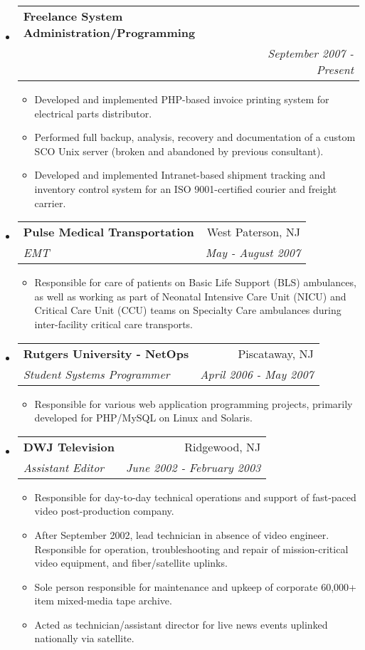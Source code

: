 \documentclass[letterpaper,11pt]{article}
\makeatletter
\newcommand{\resitem}[1]{\item #1 \vspace{-2pt}}
\newcommand{\ressubheading}[4]{
\begin{tabular*}{7.0in}{l@{\extracolsep{\fill}}r}
		\textbf{#1} & #2 \\
		\textit{#3} & \textit{#4} \\
\end{tabular*}\vspace{-6pt}}
\makeatother
\begin{document}
\begin{itemize}
\item
        \ressubheading{Freelance System Administration/Programming}{ }{ }{September 2007 - Present}
        \begin{itemize}
               \resitem{Developed and implemented PHP-based invoice printing
                 system for electrical parts distributor.}
               \resitem{Performed full backup, analysis, recovery and documentation of a
                 custom SCO Unix server (broken and abandoned by previous consultant).}
               \resitem{Developed and implemented Intranet-based shipment tracking and
                 inventory control system for an ISO 9001-certified courier
                 and freight carrier.}
        \end{itemize}
\item
        \ressubheading{Pulse Medical Transportation}{West Paterson, NJ}{EMT}{May - August 2007}
        \begin{itemize}
                \resitem{Responsible for care of patients on Basic Life
                  Support (BLS) ambulances, as well as working as part of 
                  Neonatal Intensive Care Unit (NICU) and Critical Care Unit
                  (CCU) teams on Specialty Care
                  ambulances during inter-facility critical care transports.}
        \end{itemize}
\pagebreak
\item
	\ressubheading{Rutgers University - NetOps}{Piscataway, NJ}{Student Systems Programmer}{April 2006 - May 2007}
	\begin{itemize}
		\resitem{Responsible for various web application programming projects, primarily developed for
                  PHP/MySQL on Linux and Solaris.}
	\end{itemize}

\item
        \ressubheading{DWJ Television}{Ridgewood, NJ}{Assistant Editor}{June 2002 - February 2003}
        \begin{itemize}
                \resitem{Responsible for day-to-day technical operations and
                  support of fast-paced video post-production company.}
                \resitem{After September 2002, lead technician in
                  absence of video engineer. Responsible for operation,
                  troubleshooting and repair of mission-critical video equipment,
                  and fiber/satellite uplinks.}
                \resitem{Sole person responsible for maintenance and upkeep of corporate
                  60,000+ item mixed-media tape archive.}
                \resitem{Acted as technician/assistant director for live
                  news events uplinked nationally via satellite.}
        \end{itemize}

\end{itemize}
\end{document}
